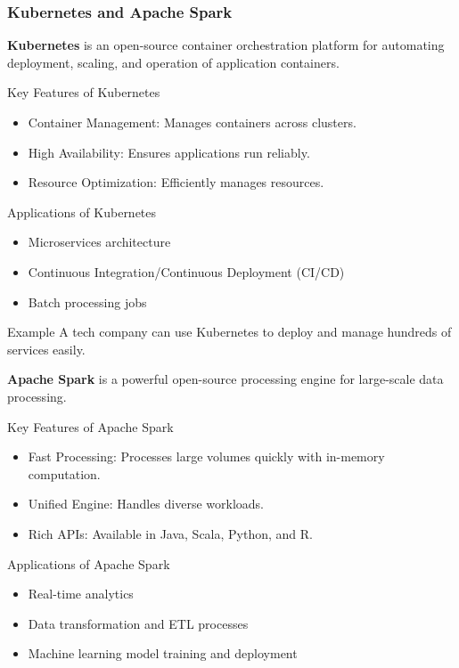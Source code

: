 \documentclass[aspectratio=169]{beamer}
\begin{document}
\begin{frame}[fragile]
    \frametitle{Kubernetes and Apache Spark}
    \textbf{Kubernetes} is an open-source container orchestration platform for automating deployment, scaling, and operation of application containers.

    \begin{block}{Key Features of Kubernetes}
        \begin{itemize}
            \item Container Management: Manages containers across clusters.
            \item High Availability: Ensures applications run reliably.
            \item Resource Optimization: Efficiently manages resources.
        \end{itemize}
    \end{block}

    \begin{block}{Applications of Kubernetes}
        \begin{itemize}
            \item Microservices architecture
            \item Continuous Integration/Continuous Deployment (CI/CD)
            \item Batch processing jobs
        \end{itemize}
    \end{block}

    \begin{block}{Example}
        A tech company can use Kubernetes to deploy and manage hundreds of services easily.
    \end{block}

    \textbf{Apache Spark} is a powerful open-source processing engine for large-scale data processing.

    \begin{block}{Key Features of Apache Spark}
        \begin{itemize}
            \item Fast Processing: Processes large volumes quickly with in-memory computation.
            \item Unified Engine: Handles diverse workloads.
            \item Rich APIs: Available in Java, Scala, Python, and R.
        \end{itemize}
    \end{block}
    
    \begin{block}{Applications of Apache Spark}
        \begin{itemize}
            \item Real-time analytics
            \item Data transformation and ETL processes
            \item Machine learning model training and deployment
        \end{itemize}
    \end{block}
    

\end{frame}
\end{document}
